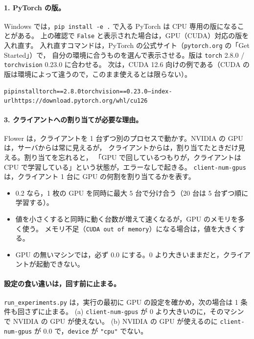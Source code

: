 \documentclass[a4j, dvipdfmx]{jsarticle}  %
\newenvironment{cmd}{\par\vspace{0.3em}\begin{alltt}\small}{\end{alltt}\vspace{0.3em}\par}
\begin{document}
\paragraph{1. PyTorch の版。}
Windows では，\texttt{pip install -e .} で入る PyTorch は CPU 専用の版になることがある。
上の確認で \texttt{False} と表示された場合は，GPU（CUDA）対応の版を入れ直す。
入れ直すコマンドは，PyTorch の公式サイト（\texttt{pytorch.org} の「Get Started」）で，
自分の環境に合うものを選んで表示させる。版は \texttt{torch} 2.8.0 / \texttt{torchvision} 0.23.0 に合わせる。
次は，CUDA 12.6 向けの例である（CUDA の版は環境によって違うので，このまま使えるとは限らない）。

\begin{cmd}
pip install torch==2.8.0 torchvision==0.23.0 --index-url https://download.pytorch.org/whl/cu126
\end{cmd}

\paragraph{3. クライアントへの割り当てが必要な理由。}
Flower は，クライアントを 1 台ずつ別のプロセスで動かす。NVIDIA の GPU は，サーバからは常に見えるが，
クライアントからは，割り当てたときだけ見える。割り当てを忘れると，
「GPU で回しているつもりが，クライアントは CPU で学習している」という状態が，エラーなしで起きる。
\texttt{client-num-gpus} は，クライアント 1 台に GPU の何割を割り当てるかを表す。

\begin{itemize}
  \item 0.2 なら，1 枚の GPU を同時に最大 5 台で分け合う（20 台は 5 台ずつ順に学習する）。
  \item 値を小さくすると同時に動く台数が増えて速くなるが，GPU のメモリを多く使う。
        メモリ不足（\texttt{CUDA out of memory}）になる場合は，値を大きくする。
  \item GPU の無いマシンでは，必ず 0.0 にする。0 より大きいままだと，クライアントが起動できない。
\end{itemize}

\paragraph{設定の食い違いは，回す前に止まる。}
\texttt{run\_experiments.py} は，実行の最初に GPU の設定を確かめ，次の場合は 1 条件も回さずに止まる。
(a) \texttt{client-num-gpus} が 0 より大きいのに，そのマシンで NVIDIA の GPU が使えない。
(b) NVIDIA の GPU が使えるのに \texttt{client-num-gpus} が 0.0 で，\texttt{device} が \texttt{"cpu"} でない。
\end{document}
